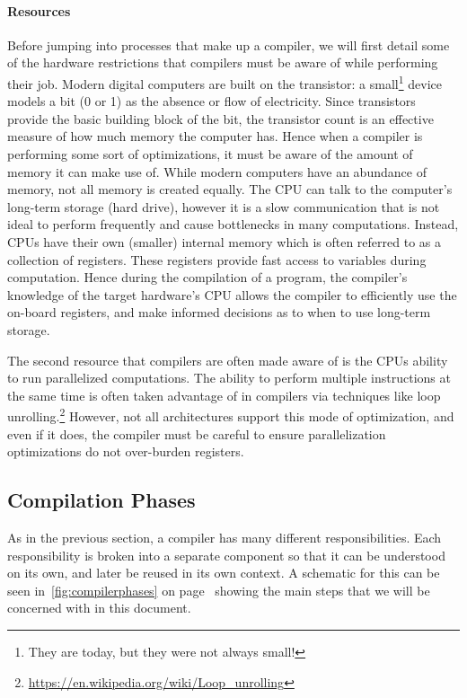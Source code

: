 \paragraph{Resources}
Before jumping into processes that make up a compiler, we will first detail some of the hardware restrictions that compilers must be aware of while performing their job.
Modern digital computers are built on the transistor: a small\footnote{They are today, but they were not always small!} device models a bit (0 or 1) as the absence or flow of electricity.
Since transistors provide the basic building block of the bit, the transistor count is an effective measure of how much memory the computer has.
Hence when a compiler is performing some sort of optimizations, it must be aware of the amount of memory it can make use of.
While modern computers have an abundance of memory, not all memory is created equally.
The \ac{CPU} can talk to the computer's long-term storage (hard drive), however it is a slow communication that is not ideal to perform frequently and cause bottlenecks in many computations.
Instead, \acp{CPU} have their own (smaller) internal memory which is often referred to as a collection of registers.
These registers provide fast access to variables during computation.
Hence during the compilation of a program, the compiler's knowledge of the target hardware's \ac{CPU} allows the compiler to efficiently use the on-board registers, and make informed decisions as to when to use long-term storage.

The second resource that compilers are often made aware of is the \acp{CPU} ability to run parallelized computations.
The ability to perform multiple instructions at the same time is often taken advantage of in compilers via techniques like loop unrolling.\footnote{\url{https://en.wikipedia.org/wiki/Loop_unrolling}}
However, not all architectures support this mode of optimization, and even if it does, the compiler must be careful to ensure parallelization optimizations do not over-burden registers.

\subsection{Compilation Phases}\label{sec:comp-phases}

As in the previous section, a compiler has many different responsibilities.
Each responsibility is broken into a separate component so that it can be understood on its own, and later be reused in its own context.
A schematic for this can be seen in~\cref{fig:compilerphases} on page~\pageref{fig:compilerphases} showing the main steps that we will be concerned with in this document.

